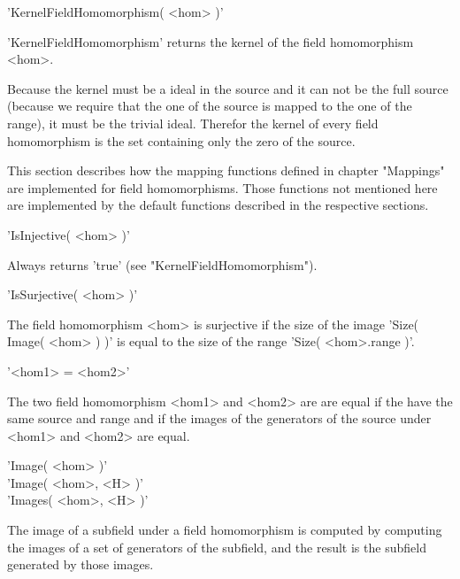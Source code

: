 %

'KernelFieldHomomorphism( <hom> )'

'KernelFieldHomomorphism' returns  the  kernel  of the field homomorphism
<hom>.

Because the kernel must be a  ideal in the source  and it can not  be the
full source  (because we  require that the one of the source is mapped to
the one of the range), it must be the trivial ideal.  Therefor the kernel
of  every field homomorphism is the set  containing  only the zero of the
source.

%
%
%
%
%
%
%

This  section describes how  the mapping  functions  defined  in  chapter
"Mappings" are implemented for field homomorphisms.  Those  functions not
mentioned here are implemented by the default functions described in  the
respective sections.

\vspace{5mm}
'IsInjective( <hom> )'

Always returns 'true' (see "KernelFieldHomomorphism").

\vspace{5mm}
'IsSurjective( <hom> )'

The  field  homomorphism  <hom> is surjective if  the  size  of the image
'Size(  Image( <hom> ) )' is equal  to  the  size  of  the  range  'Size(
<hom>.range )'.

\vspace{5mm}
'<hom1> = <hom2>'

The  two field homomorphism <hom1> and <hom2> are are equal  if  the have
the  same  source and range and  if the images of the generators  of  the
source under <hom1> and <hom2> are equal.

\vspace{5mm}
'Image( <hom> )' \\
'Image( <hom>, <H> )' \\
'Images( <hom>, <H> )'

The  image  of  a  subfield  under a  field homomorphism  is computed  by
computing the images  of  a  set of  generators of the  subfield, and the
result is the subfield generated by those images.

